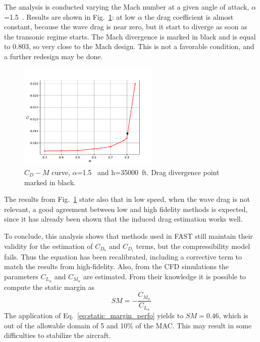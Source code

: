 The analysis is conducted varying the Mach number at a given angle of attack, $\alpha$=1.5~\si{\deg}. 
Results are shown in Fig.~\ref{fig:mach_drag_div}: at low $\alpha$ the drag coefficient is almost constant, because the wave drag is near zero, but it start to diverge as soon as the transonic regime starts. 
The Mach divergence is marked in black and is equal to 0.803, so very close to the Mach design.
This is not a favorable condition, and a further redesign may be done. 
\begin{figure}[!h]
	\centering
	\includegraphics[keepaspectratio, width=0.6\textwidth]{images/chap4/mach_divergence_euler}
	\caption{$C_D-M$ curve, $\alpha$=1.5~\si{\deg} and h=35000~ft. Drag divergence point marked in black.}
	\label{fig:mach_drag_div}
\end{figure}
The results from Fig.~\ref{fig:mach_drag_div} state also that in low speed, when the wave drag is not relevant, a good agreement between low and high fidelity methods is expected, since it has already been shown that the induced drag estimation works well. 

To conclude, this analysis shows that methods used in FAST still maintain their validity for the estimation of $C_{D_{0}}$ and $C_{D_{i}}$ terms, but the compressibility model fails. 
Thus the equation has been recalibrated, including a corrective term to match the results from high-fidelity. 
Also, from the CFD simulations the parameters $C_{L_{\alpha}}$ and $C_{M_{\alpha}}$ are estimated.
From their knowledge it is possible to compute the static margin as~\cite{bib:anderson_perfo}
\begin{equation}
	\label{eq:static_margin_perfo}
	SM = -\frac{C_{M_{\alpha}}}{C_{L_{\alpha}}}
\end{equation}
The application of Eq.~\eqref{eq:static_margin_perfo} yields to $SM=0.46$, which is out of the allowable domain of 5 and 10\% of the MAC.
This may result in some difficulties to stabilize the aircraft. 

